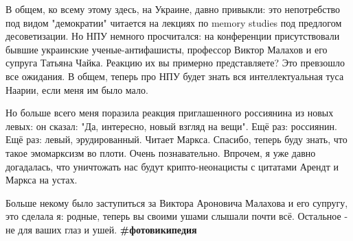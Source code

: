 В общем, ко всему этому здесь, на Украине, давно привыкли: это непотребство под
видом "демократии" читается на лекциях по memory studies под предлогом
десоветизации. Но НПУ немного просчитался: на конференции присутствовали бывшие
украинские ученые-антифашисты, профессор Виктор Малахов и его супруга Татьяна
Чайка. Реакцию их вы примерно представляете? Это превзошло все ожидания. В
общем, теперь про НПУ будет знать вся интеллектуальная туса Наарии, если меня
им было мало. 

Но больше всего меня поразила реакция приглашенного россиянина из новых левых:
он сказал: "Да, интересно, новый взгляд на вещи". Ещё раз: россиянин. Ещё раз:
левый, эрудированный. Читает Маркса. Спасибо, теперь буду знать, что такое
эмомарксизм во плоти. Очень познавательно. Впрочем, я уже давно догадалась, что
уничтожать нас будут крипто-неонацисты с цитатами Арендт и Маркса на устах.

Больше некому было заступиться за Виктора Ароновича Малахова и его супругу, это
сделала я: родные, теперь вы своими ушами слышали почти всё. Остальное - не для
ваших глаз и ушей. \textbf{\#фотовикипедия}
